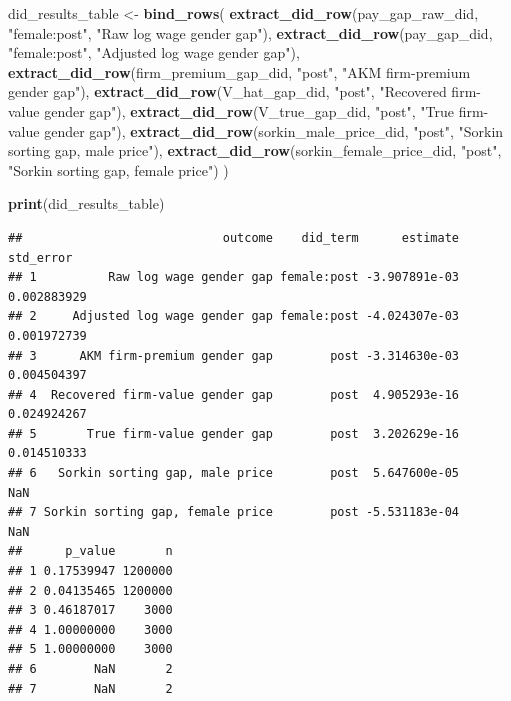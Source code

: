 \documentclass[
]{article}
\newenvironment{Shaded}{\begin{snugshade}}{\end{snugshade}}
\newcommand{\FunctionTok}[1]{\textcolor[rgb]{0.13,0.29,0.53}{\textbf{#1}}}
\newcommand{\NormalTok}[1]{#1}
\newcommand{\OtherTok}[1]{\textcolor[rgb]{0.56,0.35,0.01}{#1}}
\newcommand{\StringTok}[1]{\textcolor[rgb]{0.31,0.60,0.02}{#1}}
\begin{document}
\begin{Shaded}
\begin{Highlighting}[]
\NormalTok{did\_results\_table }\OtherTok{\textless{}{-}} \FunctionTok{bind\_rows}\NormalTok{(}
    \FunctionTok{extract\_did\_row}\NormalTok{(pay\_gap\_raw\_did, }\StringTok{"female:post"}\NormalTok{, }\StringTok{"Raw log wage gender gap"}\NormalTok{),}
    \FunctionTok{extract\_did\_row}\NormalTok{(pay\_gap\_did, }\StringTok{"female:post"}\NormalTok{, }\StringTok{"Adjusted log wage gender gap"}\NormalTok{),}
    \FunctionTok{extract\_did\_row}\NormalTok{(firm\_premium\_gap\_did, }\StringTok{"post"}\NormalTok{, }\StringTok{"AKM firm{-}premium gender gap"}\NormalTok{),}
    \FunctionTok{extract\_did\_row}\NormalTok{(V\_hat\_gap\_did, }\StringTok{"post"}\NormalTok{, }\StringTok{"Recovered firm{-}value gender gap"}\NormalTok{),}
    \FunctionTok{extract\_did\_row}\NormalTok{(V\_true\_gap\_did, }\StringTok{"post"}\NormalTok{, }\StringTok{"True firm{-}value gender gap"}\NormalTok{),}
    \FunctionTok{extract\_did\_row}\NormalTok{(sorkin\_male\_price\_did, }\StringTok{"post"}\NormalTok{, }\StringTok{"Sorkin sorting gap, male price"}\NormalTok{),}
    \FunctionTok{extract\_did\_row}\NormalTok{(sorkin\_female\_price\_did, }\StringTok{"post"}\NormalTok{, }\StringTok{"Sorkin sorting gap, female price"}\NormalTok{)}
\NormalTok{)}

\FunctionTok{print}\NormalTok{(did\_results\_table)}
\end{Highlighting}
\end{Shaded}

\begin{verbatim}
##                            outcome    did_term      estimate   std_error
## 1          Raw log wage gender gap female:post -3.907891e-03 0.002883929
## 2     Adjusted log wage gender gap female:post -4.024307e-03 0.001972739
## 3      AKM firm-premium gender gap        post -3.314630e-03 0.004504397
## 4  Recovered firm-value gender gap        post  4.905293e-16 0.024924267
## 5       True firm-value gender gap        post  3.202629e-16 0.014510333
## 6   Sorkin sorting gap, male price        post  5.647600e-05         NaN
## 7 Sorkin sorting gap, female price        post -5.531183e-04         NaN
##      p_value       n
## 1 0.17539947 1200000
## 2 0.04135465 1200000
## 3 0.46187017    3000
## 4 1.00000000    3000
## 5 1.00000000    3000
## 6        NaN       2
## 7        NaN       2
\end{verbatim}
\end{document}
